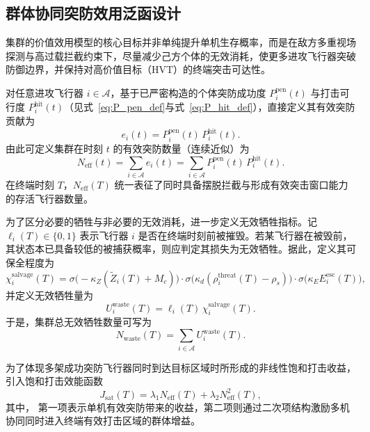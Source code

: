 \subsection{群体协同突防效用泛函设计}

集群的价值效用模型的核心目标并非单纯提升单机生存概率，而是在敌方多重视场探测与高过载拦截约束下，尽量减少己方个体的无效消耗，使更多进攻飞行器突破防御边界，并保持对高价值目标（HVT）的终端突击可达性。

对任意进攻飞行器 $i\in\mathcal{A}$，基于已严密构造的个体突防成功度 $P_i^{\mathrm{pen}}(t)$ 与打击可行度 $P_i^{\mathrm{hit}}(t)$（见式~\eqref{eq:P_pen_def}与式~\eqref{eq:P_hit_def}），直接定义其有效突防贡献为
\begin{equation}
e_i(t)
=
P_i^{\mathrm{pen}}(t)\,P_i^{\mathrm{hit}}(t).
\end{equation}
由此可定义集群在时刻 $t$ 的有效突防数量（连续近似）为
\begin{equation}
N_{\mathrm{eff}}(t)
=
\sum_{i\in\mathcal{A}} e_i(t)
=
\sum_{i\in\mathcal{A}} P_i^{\mathrm{pen}}(t)\,P_i^{\mathrm{hit}}(t).
\end{equation}
在终端时刻 $T$，$N_{\mathrm{eff}}(T)$ 统一表征了同时具备摆脱拦截与形成有效突击窗口能力的存活飞行器数量。

为了区分必要的牺牲与非必要的无效消耗，进一步定义无效牺牲指标。记 $\ell_i(T)\in\{0,1\}$ 表示飞行器 $i$ 是否在终端时刻前被摧毁。若某飞行器在被毁前，其状态本已具备较低的被捕获概率，则应判定其损失为无效牺牲。据此，定义其可保全程度为
\begin{equation}
\chi_i^{\mathrm{salvage}}(T)
=
\sigma\!\bigl(-\kappa_Z(\widetilde Z_i(T)+M_c)\bigr)
\cdot
\sigma\!\bigl(\kappa_d(\rho_i^{\mathrm{threat}}(T)-\rho_s)\bigr)
\cdot
\sigma\!\bigl(\kappa_E E_i^{\mathrm{esc}}(T)\bigr),
\end{equation}
并定义无效牺牲量为
\begin{equation}
U_i^{\mathrm{waste}}(T)
=
\ell_i(T)\,\chi_i^{\mathrm{salvage}}(T).
\end{equation}
于是，集群总无效牺牲数量可写为
\begin{equation}
N_{\mathrm{waste}}(T)
=
\sum_{i\in\mathcal{A}} U_i^{\mathrm{waste}}(T).
\end{equation}

为了体现多架成功突防飞行器同时到达目标区域时所形成的非线性饱和打击收益，引入饱和打击效能函数
\begin{equation}
J_{\mathrm{sat}}(T)
=
\lambda_1 N_{\mathrm{eff}}(T)
+
\lambda_2 N_{\mathrm{eff}}^2(T),
\end{equation}
其中， 第一项表示单机有效突防带来的收益，第二项则通过二次项结构激励多机协同同时进入终端有效打击区域的群体增益。

